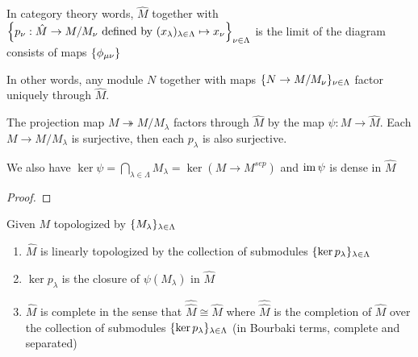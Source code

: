 \begin{remark}[completion]
	In category theory words, $\hat{M}$ together with $\set*{p_\nu: \hat{M} \to M / M_\nu  \text{ defined by } (x_\lambda)_{\lambda \in \Lambda} \mapsto x_\nu}_{\nu \in \Lambda}$ is the limit of the diagram consists of maps $\set{\phi_{\mu \nu}}$
	
	\begin{center}
	\end{center}
	
	In other words,  any module $N$ together with maps $\set{N \to M / M_\nu}_{\nu \in \Lambda}$ factor uniquely through $\hat{M}$.
\end{remark}

\begin{remark}
	The projection map $M \twoheadrightarrow M / M_\lambda$ factors through $\hat{M}$ by the map $\psi: M \to \hat{M}$. Each $M \to M / M_\lambda$ is surjective, then each $p_\lambda$ is also surjective.
	
	\begin{center}
	\end{center}
	
	We also have $\ker \psi = \bigcap_{\lambda \in \Lambda} M_\lambda = \ker (M \to M^{sep})$ and $\im \psi$ is dense in $\hat{M}$
\end{remark}

\begin{proof}
\end{proof}

\begin{proposition}
	Given $M$ topologized by $\set{M_\lambda}_{\lambda \in \Lambda}$
	\begin{enumerate}
		\item $\hat{M}$ is linearly topologized by the collection of submodules $\set{\ker p_\lambda}_{\lambda \in \Lambda}$
		\item $\ker p_\lambda$ is the closure of $\psi(M_\lambda)$ in $\hat{M}$
		\item $\hat{M}$ is complete in the sense that $\hat{\hat{M}} \cong \hat{M}$ where $\hat{\hat{M}}$ is the completion of $\hat{M}$ over the collection of submodules $\set{\ker p_\lambda}_{\lambda \in \Lambda}$ (in Bourbaki terms, complete and separated)
	\end{enumerate}
\end{proposition}

